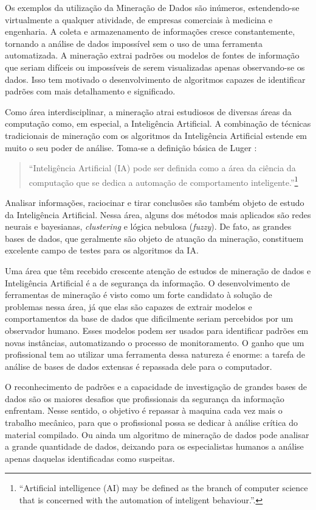 Os exemplos da utilização da Mineração de Dados são inúmeros, estendendo-se virtualmente a qualquer atividade, de empresas comerciais à medicina e engenharia. A coleta e armazenamento de informações cresce constantemente, tornando a análise de dados impossível sem o uso de uma ferramenta automatizada. A mineração extrai padrões ou modelos de fontes de informação que seriam difíceis ou impossíveis de serem visualizadas apenas observando-se os dados. Isso tem motivado o desenvolvimento de algoritmos capazes de identificar padrões com mais detalhamento e significado.

Como área interdisciplinar, a mineração atrai estudiosos de diversas áreas da computação como, em especial, a Inteligência Artificial. A combinação de técnicas tradicionais de mineração com os algoritmos da Inteligência Artificial estende em muito o seu poder de análise. Toma-se a definição básica de Luger \cite[p. 1]{Luger2009}:

\begin{quote}
``Inteligência Artificial (IA) pode ser definida como a área da ciência da computação que se dedica a automação de comportamento inteligente.''\footnote{``Artificial intelligence (AI) may be defined as the branch of computer science that is concerned with the automation of inteligent behaviour.''.}
\end{quote}

Analisar informações, raciocinar e tirar conclusões são também objeto de estudo da Inteligência Artificial. Nessa área, alguns dos métodos mais aplicados são redes neurais e bayesianas, \emph{clustering} e lógica nebulosa (\emph{fuzzy}). De fato, as grandes bases de dados, que geralmente são objeto de atuação da mineração, constituem excelente campo de testes para os algoritmos da IA. 

Uma área que têm recebido crescente atenção de estudos de mineração de dados e Inteligência Artificial é a de segurança da informação. O desenvolvimento de ferramentas de mineração é visto como um forte candidato à solução de problemas nessa área, já que elas são capazes de extrair modelos e comportamentos da base de dados que dificilmente seriam percebidos por um observador humano. Esses modelos podem ser usados para identificar padrões em novas instâncias, automatizando o processo de monitoramento. O ganho que um profissional tem ao utilizar uma ferramenta dessa natureza é enorme: a tarefa de análise de bases de dados extensas é repassada dele para o computador.

O reconhecimento de padrões e a capacidade de investigação de grandes bases de dados são os maiores desafios que profissionais da segurança da informação enfrentam. Nesse sentido, o objetivo é repassar à maquina cada vez mais o trabalho mecânico, para que o profissional possa se dedicar à análise crítica do material compilado. Ou ainda um algoritmo de mineração de dados pode analisar a grande quantidade de dados, deixando para os especialistas humanos a análise apenas daquelas identificadas como suspeitas.

